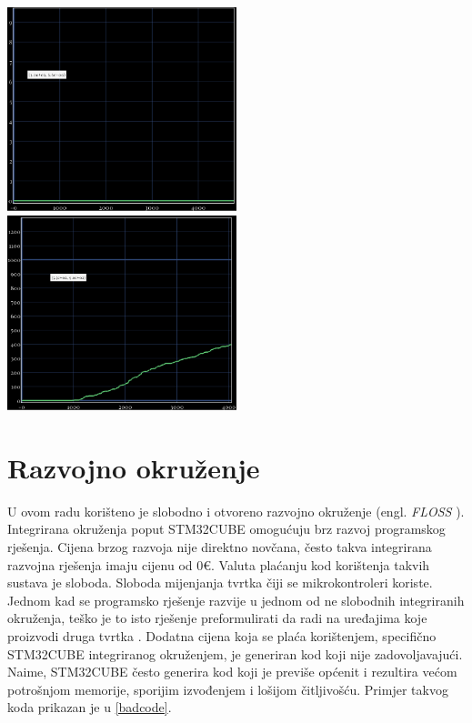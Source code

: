 \documentclass[times, utf8, diplomski]{diplomski}
\begin{document}
\includegraphics[width=0.5\textwidth]{packets_lost_every_6ms.png}\hspace{0.05\textwidth}%
\includegraphics[width=0.5\textwidth]{packets_lost_every_5ms.png}\par
 

\chapter{Razvojno okruženje}
U ovom radu korišteno je slobodno i otvoreno razvojno okruženje (engl. \textit{FLOSS} \cite{FLOSS}). Integrirana okruženja poput STM32CUBE omogućuju brz razvoj programskog rješenja. Cijena brzog razvoja nije direktno novčana, često takva integrirana razvojna rješenja imaju cijenu od 0€. Valuta plaćanju kod korištenja takvih sustava je sloboda. Sloboda mijenjanja tvrtka čiji se mikrokontroleri koriste. Jednom kad se programsko rješenje razvije u jednom od ne slobodnih integriranih okruženja, teško je to isto rješenje preformulirati da radi na uređajima koje proizvodi druga tvrtka \cite{VENDORLOCKIN}. Dodatna cijena koja se plaća korištenjem, specifično STM32CUBE integriranog okruženjem, je generiran kod koji nije zadovoljavajući. Naime, STM32CUBE često generira kod koji je previše općenit i rezultira većom potrošnjom memorije, sporijim izvođenjem i lošijom čitljivošću. Primjer takvog koda prikazan je u \ref{badcode}.


\end{document}
